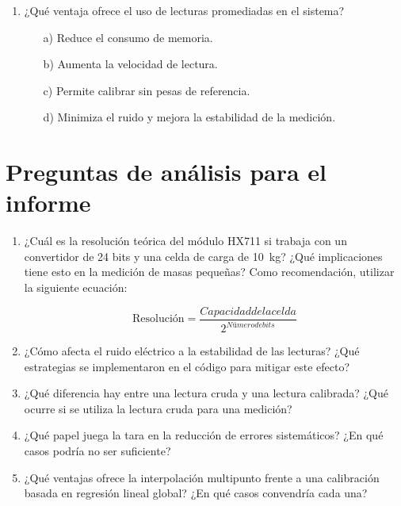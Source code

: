 \begin{enumerate}
  \item ¿Qué ventaja ofrece el uso de lecturas promediadas en el sistema?
  \begin{itemize}
    \item[a)] Reduce el consumo de memoria.
    \item[b)] Aumenta la velocidad de lectura.
    \item[c)] Permite calibrar sin pesas de referencia.
    \item[d)] Minimiza el ruido y mejora la estabilidad de la medición.
  \end{itemize}

\end{enumerate}



\section*{Preguntas de análisis para el informe}

\begin{enumerate}

  \item ¿Cuál es la resolución teórica del módulo HX711 si trabaja con un convertidor de 24 bits y una celda de carga de \SI{10}{\kilogram}? ¿Qué implicaciones tiene esto en la medición de masas pequeñas? Como recomendación, utilizar la siguiente ecuación:

  \[
  \text{Resolución} = \frac{Capacidad de la celda}{2^{Número de bits}}
  \]

  \item ¿Cómo afecta el ruido eléctrico a la estabilidad de las lecturas? ¿Qué estrategias se implementaron en el código para mitigar este efecto?

  \item ¿Qué diferencia hay entre una lectura cruda y una lectura calibrada? ¿Qué ocurre si se utiliza la lectura cruda para una medición?

  \item ¿Qué papel juega la tara en la reducción de errores sistemáticos? ¿En qué casos podría no ser suficiente?

  \item ¿Qué ventajas ofrece la interpolación multipunto frente a una calibración basada en regresión lineal global? ¿En qué casos convendría cada una?

  
\end{enumerate}
  
